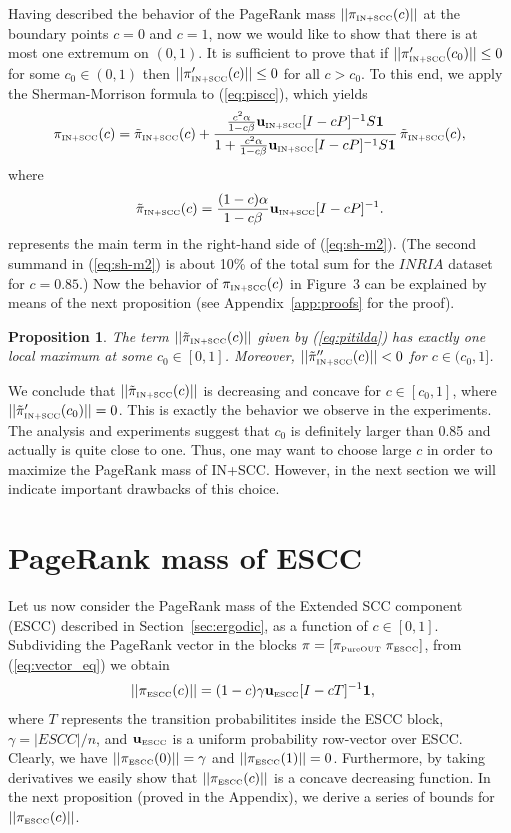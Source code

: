 \documentclass{article}
\newtheorem{proposition}{Proposition}
\newcommand{\onedn}{{\bf 1}}
\newcommand{\piscc}{\pi_{\mbox{\tiny IN+SCC}}}
\newcommand{\scc}{{\mbox{\tiny IN+SCC}}}
\newcommand{\escc}{{\mbox{\tiny ESCC}}}
\newcommand{\pureout}{{\mbox{\tiny PureOUT}}}
\newcommand{\onesccn}{{\bf 1}}
\def\u{{{\bf u}_{\mbox{\tiny IN+SCC}}}}
\def\ue{{{\bf u}_{\mbox{\tiny ESCC}}}}
\begin{document}
Having described the behavior of the PageRank mass $||\piscc(c)||$
at the boundary points $c=0$ and $c=1$, now we would like to show
that there is at most one extremum on $(0,1)$. It is sufficient to
prove that if $||\piscc'(c_0)||\le 0$ for some $c_0\in(0,1)$ then
$||\piscc'(c)||\le 0$ for all $c>c_0$. To this end, we apply the
Sherman-Morrison formula to (\ref{eq:piscc}), which yields
\begin{equation}
\label{eq:sh-m2}
\piscc(c)=\tilde{\pi}_\scc(c)+\frac{\frac{c^2\alpha}{1-c\beta}
\u[I-cP]^{-1}S\onedn}{1+\frac{c^2\alpha}{1-c\beta}\u[I-cP]^{-1}S\onedn}\,\tilde{\pi}_\scc(c),
\end{equation}
where
\begin{equation}
\label{eq:pitilda}
\tilde{\pi}_{\scc}(c)=\frac{(1-c)\alpha}{1-c\beta}\u[I-cP]^{-1}.\end{equation}
represents the main term in the right-hand side of (\ref{eq:sh-m2}).
(The second summand in (\ref{eq:sh-m2}) is about 10\% of the total
sum for the $INRIA$ dataset for $c=0.85$.) Now the behavior of
$\pi_\scc(c)$ in Figure~3 can be explained by means of the next
proposition (see Appendix~\ref{app:proofs} for the proof).
\begin{proposition}
\label{prop:pitilda} The term $||\tilde{\pi}_\scc(c)||$ given by
(\ref{eq:pitilda}) has exactly one local maximum at some $c_0\in
[0,1]$. Moreover, $||\tilde{\pi}''_\scc(c)||<0$ for $c\in
(c_0,1]$.
\end{proposition}
We conclude that
 $||\tilde{\pi}_\scc(c)||$ is decreasing and concave
for $c\in[c_0,1]$, where $||\tilde{\pi}'_\scc (c_0)||=0$. This is exactly the behavior we observe in the
experiments. The analysis and experiments suggest that $c_0$ is definitely larger than 0.85 and actually is quite close to one. Thus, one may want to choose large $c$ in order to maximize the PageRank mass of IN+SCC. However, in the next section we will indicate important drawbacks of this choice.


\section{PageRank mass of ESCC}
\label{sec:bounds}

Let us now consider the PageRank mass of the Extended SCC component
(ESCC) described in Section~\ref{sec:ergodic}, as a function of $c
\in [0,1]$. Subdividing the PageRank vector in the blocks
$\pi=[\pi_{\pureout}\;\pi_\escc]$, from (\ref{eq:vector_eq}) we
obtain
\begin{align}
\label{eq:piescc_sum}
||\pi_\escc(c)||&=(1-c)\gamma\ue[I-cT]^{-1}\onesccn,\end{align}
where $T$ represents the transition probabilitites inside the ESCC
block, $\gamma=|ESCC|/n$, and $\ue$ is a uniform probability
row-vector over ESCC. Clearly, we have $||\pi_\escc(0)||=\gamma$ and
$||\pi_\escc(1)||=0$. Furthermore, by taking derivatives we easily
show that $||\pi_\escc(c)||$ is a concave decreasing function. In
the next proposition (proved in the Appendix), we derive a series of
bounds for $||\pi_\escc(c)||$.
\end{document}
